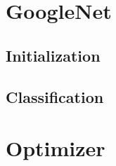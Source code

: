 

\section{GoogleNet}\label{sec:gogl}
\subsection{Initialization}

\subsection{Classification}

\section{Optimizer}
